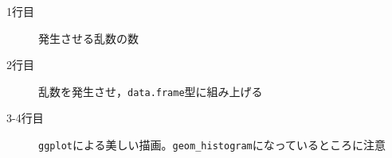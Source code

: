 \begin{description}
	\item[1行目] 発生させる乱数の数
	\item[2行目] 乱数を発生させ，\texttt{data.frame}型に組み上げる
	\item[3-4行目] \texttt{ggplot}による美しい描画。\verb|geom_histogram|になっているところに注意
\end{description}
